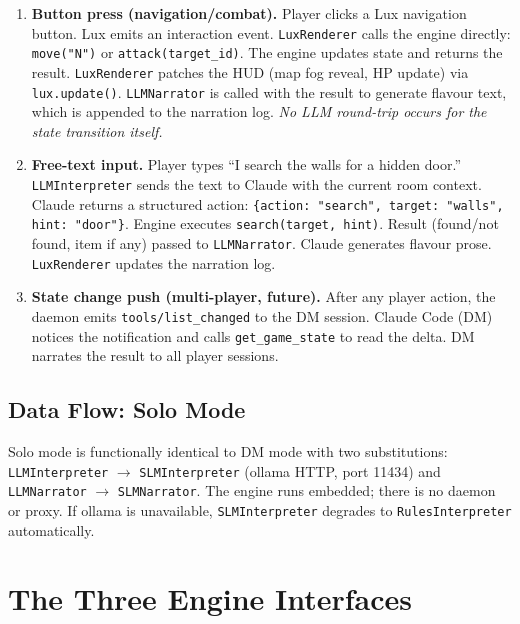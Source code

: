 \documentclass[a4paper,10pt]{article}
\newcommand{\tool}[1]{\texttt{#1}}
\begin{document}
\begin{enumerate}
  \item \textbf{Button press (navigation/combat).}
    Player clicks a Lux navigation button.  Lux emits an interaction
    event.  \texttt{LuxRenderer} calls the engine directly:
    \tool{move("N")} or \tool{attack(target\_id)}.
    The engine updates state and returns the result.
    \texttt{LuxRenderer} patches the HUD (map fog reveal, HP update)
    via \tool{lux.update()}.
    \texttt{LLMNarrator} is called with the result to generate
    flavour text, which is appended to the narration log.
    \emph{No LLM round-trip occurs for the state transition itself.}
  \item \textbf{Free-text input.}
    Player types ``I search the walls for a hidden door.''
    \texttt{LLMInterpreter} sends the text to Claude with the current
    room context.  Claude returns a structured action:
    \texttt{\{action: "search", target: "walls", hint: "door"\}}.
    Engine executes \tool{search(target, hint)}.
    Result (found/not found, item if any) passed to
    \texttt{LLMNarrator}.  Claude generates flavour prose.
    \texttt{LuxRenderer} updates the narration log.
  \item \textbf{State change push (multi-player, future).}
    After any player action, the daemon emits
    \texttt{tools/list\_changed} to the DM session.
    Claude Code (DM) notices the notification and calls
    \tool{get\_game\_state} to read the delta.
    DM narrates the result to all player sessions.
\end{enumerate}

\subsection{Data Flow: Solo Mode}

Solo mode is functionally identical to DM mode with two substitutions:
\texttt{LLMInterpreter} $\to$ \texttt{SLMInterpreter} (ollama HTTP,
port 11434) and \texttt{LLMNarrator} $\to$ \texttt{SLMNarrator}.
The engine runs embedded; there is no daemon or proxy.  If ollama is
unavailable, \texttt{SLMInterpreter} degrades to
\texttt{RulesInterpreter} automatically.

\section{The Three Engine Interfaces}
\label{sec:interfaces}
\end{document}
